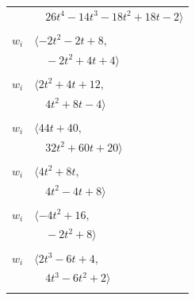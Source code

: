 \documentclass[11pt]{article}
\begin{document}
\begin{longtable}{@{}ll@{}}
 & $\quad 26t^{4}-14t^{3}-18t^{2}+18t-2\rangle$\\
\addlinespace[2pt]
\multicolumn{2}{@{}p{0.97\textwidth}@{}}{$i=6$, $D_i=2$, $\rho_{ij}$: $4{:}1, \allowbreak 17{:}1, \allowbreak 19{:}2, \allowbreak 23{:}1, \allowbreak 25{:}2$}\\
$w_i$ & $\langle -2t^{2}-2t+8,$\\
 & $\quad -2t^{2}+4t+4\rangle$\\
\addlinespace[2pt]
\multicolumn{2}{@{}p{0.97\textwidth}@{}}{$i=7$, $D_i=2$, $\rho_{ij}$: $3{:}2, \allowbreak 5{:}1, \allowbreak 11{:}1, \allowbreak 13{:}2, \allowbreak 14{:}2, \allowbreak 17{:}1, \allowbreak 19{:}2, \allowbreak 20{:}1, \allowbreak 22{:}1$}\\
$w_i$ & $\langle 2t^{2}+4t+12,$\\
 & $\quad 4t^{2}+8t-4\rangle$\\
\addlinespace[2pt]
\multicolumn{2}{@{}p{0.97\textwidth}@{}}{$i=8$, $D_i=4$, $\rho_{ij}$: $0{:}2, \allowbreak 13{:}2, \allowbreak 16{:}2, \allowbreak 17{:}2, \allowbreak 18{:}2, \allowbreak 19{:}2, \allowbreak 20{:}1, \allowbreak 23{:}2, \allowbreak 24{:}2, \allowbreak 27{:}2$}\\
$w_i$ & $\langle 44t+40,$\\
 & $\quad 32t^{2}+60t+20\rangle$\\
\addlinespace[2pt]
\multicolumn{2}{@{}p{0.97\textwidth}@{}}{$i=9$, $D_i=4$, $\rho_{ij}$: $0{:}1, \allowbreak 3{:}2, \allowbreak 5{:}1, \allowbreak 14{:}1, \allowbreak 15{:}1, \allowbreak 18{:}2, \allowbreak 26{:}2, \allowbreak 27{:}2$}\\
$w_i$ & $\langle 4t^{2}+8t,$\\
 & $\quad 4t^{2}-4t+8\rangle$\\
\addlinespace[2pt]
\multicolumn{2}{@{}p{0.97\textwidth}@{}}{$i=10$, $D_i=2$, $\rho_{ij}$: $0{:}1, \allowbreak 3{:}2, \allowbreak 18{:}1, \allowbreak 20{:}2, \allowbreak 21{:}2$}\\
$w_i$ & $\langle -4t^{2}+16,$\\
 & $\quad -2t^{2}+8\rangle$\\
\addlinespace[2pt]
\multicolumn{2}{@{}p{0.97\textwidth}@{}}{$i=11$, $D_i=2$, $\rho_{ij}$: $1{:}1, \allowbreak 4{:}2, \allowbreak 7{:}2, \allowbreak 13{:}2, \allowbreak 17{:}2$}\\
$w_i$ & $\langle 2t^{3}-6t+4,$\\
 & $\quad 4t^{3}-6t^{2}+2\rangle$\\
\addlinespace[2pt]
\multicolumn{2}{@{}p{0.97\textwidth}@{}}{$i=12$, $D_i=2$, $\rho_{ij}$: $5{:}1, \allowbreak 18{:}1, \allowbreak 19{:}1, \allowbreak 21{:}2, \allowbreak 23{:}2$}\\

\end{longtable}
\end{document}
